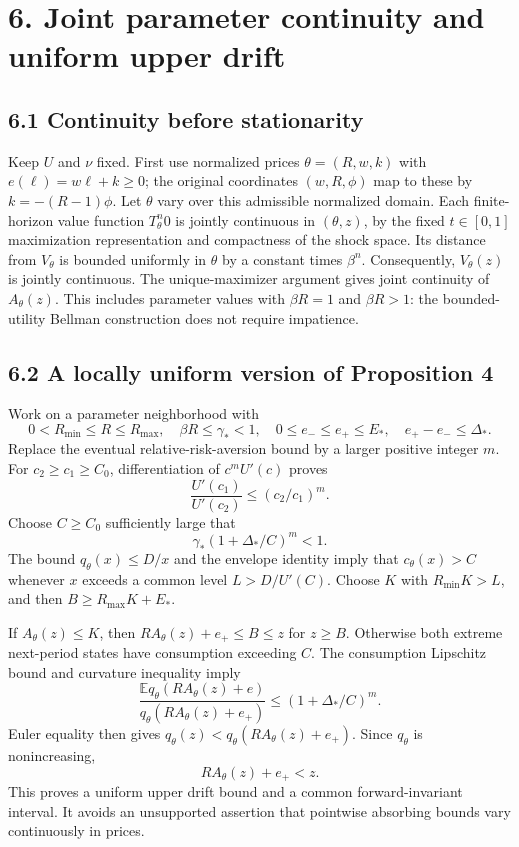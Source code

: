 \documentclass[
  11pt,
]{article}
\begin{document}
\section{6. Joint parameter continuity and uniform upper
drift}\label{joint-parameter-continuity-and-uniform-upper-drift}

\subsection{6.1 Continuity before
stationarity}\label{continuity-before-stationarity}

Keep \(U\) and \(\nu\) fixed. First use normalized prices
\(\theta=(R,w,k)\) with \(e(\ell)=w\ell+k\geq0\); the original
coordinates \((w,R,\phi)\) map to these by \(k=-(R-1)\phi\). Let
\(\theta\) vary over this admissible normalized domain. Each
finite-horizon value function \(T_\theta^n0\) is jointly continuous in
\((\theta,z)\), by the fixed \(t\in[0,1]\) maximization representation
and compactness of the shock space. Its distance from \(V_\theta\) is
bounded uniformly in \(\theta\) by a constant times \(\beta^n\).
Consequently, \(V_\theta(z)\) is jointly continuous. The
unique-maximizer argument gives joint continuity of \(A_\theta(z)\).
This includes parameter values with \(\beta R=1\) and \(\beta R>1\): the
bounded-utility Bellman construction does not require impatience.

\subsection{6.2 A locally uniform version of Proposition
4}\label{a-locally-uniform-version-of-proposition-4}

Work on a parameter neighborhood with \[
0<R_{\min}\leq R\leq R_{\max},\quad \beta R\leq\gamma_*<1,
\quad 0\leq e_-\leq e_+\leq E_*,\quad e_+-e_-\leq\Delta_*.
\] Replace the eventual relative-risk-aversion bound by a larger
positive integer \(m\). For \(c_2\geq c_1\geq C_0\), differentiation of
\(c^mU'(c)\) proves \[
\frac{U'(c_1)}{U'(c_2)}\leq(c_2/c_1)^m.
\] Choose \(C\geq C_0\) sufficiently large that \[
\gamma_*\left(1+\Delta_*/C\right)^m<1.
\] The bound \(q_\theta(x)\leq D/x\) and the envelope identity imply
that \(c_\theta(x)>C\) whenever \(x\) exceeds a common level
\(L>D/U'(C)\). Choose \(K\) with \(R_{\min}K>L\), and then
\(B\geq R_{\max}K+E_*\).

If \(A_\theta(z)\leq K\), then \(RA_\theta(z)+e_+\leq B\leq z\) for
\(z\geq B\). Otherwise both extreme next-period states have consumption
exceeding \(C\). The consumption Lipschitz bound and curvature
inequality imply \[
\frac{\mathbb E q_\theta(RA_\theta(z)+e)}{q_\theta(RA_\theta(z)+e_+)}
\leq(1+\Delta_*/C)^m.
\] Euler equality then gives \(q_\theta(z)<q_\theta(RA_\theta(z)+e_+)\).
Since \(q_\theta\) is nonincreasing, \[
RA_\theta(z)+e_+<z.
\] This proves a uniform upper drift bound and a common
forward-invariant interval. It avoids an unsupported assertion that
pointwise absorbing bounds vary continuously in prices.
\end{document}
